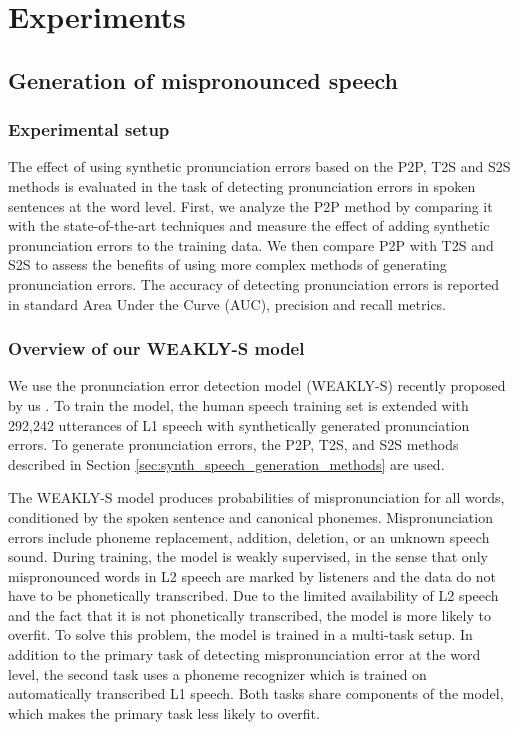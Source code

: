 \documentclass[]{interact}
\theoremstyle{plain}%
\theoremstyle{definition}
\theoremstyle{remark}
\begin{document}
\section{Experiments}
\label{sec:experiments_pronunciation}

\subsection{Generation of mispronounced speech}
\label{sec:p2p_gen_of_incorrectly_pron_speech}

\subsubsection{Experimental setup}

The effect of using synthetic pronunciation errors based on the P2P, T2S and S2S methods is evaluated in the task of detecting pronunciation errors in spoken sentences at the word level. First, we analyze the P2P method by comparing it with the state-of-the-art techniques and measure the effect of adding synthetic pronunciation errors to the training data. We then compare P2P with T2S and S2S to assess the benefits of using more complex methods of generating pronunciation errors. The accuracy of detecting pronunciation errors is reported in standard Area Under the Curve (AUC), precision and recall metrics. 

\subsubsection{Overview of our WEAKLY-S model}

We use the pronunciation error detection model (WEAKLY-S) recently proposed by us \cite{korzekwa21b_interspeech}. To train the model, the human speech training set is extended with 292,242 utterances of L1 speech with synthetically generated pronunciation errors. To generate pronunciation errors, the P2P, T2S, and S2S methods described in Section \ref{sec:synth_speech_generation_methods} are used.

The WEAKLY-S model produces probabilities of mispronunciation for all words, conditioned by the spoken sentence and canonical phonemes. Mispronunciation errors include phoneme replacement, addition, deletion, or an unknown speech sound. During training, the model is weakly supervised, in the sense that only mispronounced words in L2 speech are marked by listeners and the data do not have to be phonetically transcribed. Due to the limited availability of L2 speech and the fact that it is not phonetically transcribed, the model is more likely to overfit. To solve this problem, the model is trained in a multi-task setup. In addition to the primary task of detecting mispronunciation error at the word level, the second task uses a phoneme recognizer which is trained on automatically transcribed L1 speech. Both tasks share components of the model, which makes the primary task less likely to overfit.
\end{document}
